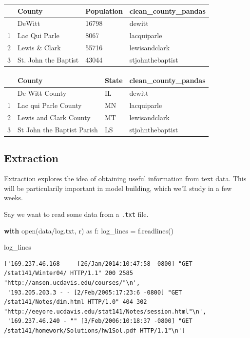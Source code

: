 \documentclass[
  letterpaper,
  DIV=11,
  numbers=noendperiod]{scrreprt}
\newenvironment{Shaded}{\begin{snugshade}}{\end{snugshade}}
\newcommand{\BuiltInTok}[1]{\textcolor[rgb]{0.00,0.23,0.31}{#1}}
\newcommand{\ControlFlowTok}[1]{\textcolor[rgb]{0.00,0.23,0.31}{\textbf{#1}}}
\newcommand{\ImportTok}[1]{\textcolor[rgb]{0.00,0.46,0.62}{#1}}
\newcommand{\NormalTok}[1]{\textcolor[rgb]{0.00,0.23,0.31}{#1}}
\newcommand{\OperatorTok}[1]{\textcolor[rgb]{0.37,0.37,0.37}{#1}}
\newcommand{\StringTok}[1]{\textcolor[rgb]{0.13,0.47,0.30}{#1}}
\begin{document}
\begin{longtable}[]{@{}llll@{}}
\toprule\noalign{}
& County & Population & clean\_county\_pandas \\
\midrule\noalign{}
\endhead
\bottomrule\noalign{}
\endlastfoot
0 & DeWitt & 16798 & dewitt \\
1 & Lac Qui Parle & 8067 & lacquiparle \\
2 & Lewis \& Clark & 55716 & lewisandclark \\
3 & St. John the Baptist & 43044 & stjohnthebaptist \\
\end{longtable}

\begin{longtable}[]{@{}llll@{}}
\toprule\noalign{}
& County & State & clean\_county\_pandas \\
\midrule\noalign{}
\endhead
\bottomrule\noalign{}
\endlastfoot
0 & De Witt County & IL & dewitt \\
1 & Lac qui Parle County & MN & lacquiparle \\
2 & Lewis and Clark County & MT & lewisandclark \\
3 & St John the Baptist Parish & LS & stjohnthebaptist \\
\end{longtable}

\subsection{Extraction}\label{extraction}

Extraction explores the idea of obtaining useful information from text
data. This will be particularily important in model building, which
we'll study in a few weeks.

Say we want to read some data from a \texttt{.txt} file.

\begin{Shaded}
\begin{Highlighting}[]
\ControlFlowTok{with} \BuiltInTok{open}\NormalTok{(}\StringTok{\textquotesingle{}data/log.txt\textquotesingle{}}\NormalTok{, }\StringTok{\textquotesingle{}r\textquotesingle{}}\NormalTok{) }\ImportTok{as}\NormalTok{ f:}
\NormalTok{    log\_lines }\OperatorTok{=}\NormalTok{ f.readlines()}

\NormalTok{log\_lines}
\end{Highlighting}
\end{Shaded}

\begin{verbatim}
['169.237.46.168 - - [26/Jan/2014:10:47:58 -0800] "GET /stat141/Winter04/ HTTP/1.1" 200 2585 "http://anson.ucdavis.edu/courses/"\n',
 '193.205.203.3 - - [2/Feb/2005:17:23:6 -0800] "GET /stat141/Notes/dim.html HTTP/1.0" 404 302 "http://eeyore.ucdavis.edu/stat141/Notes/session.html"\n',
 '169.237.46.240 - "" [3/Feb/2006:10:18:37 -0800] "GET /stat141/homework/Solutions/hw1Sol.pdf HTTP/1.1"\n']
\end{verbatim}
\end{document}
